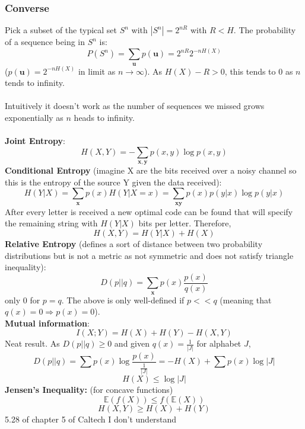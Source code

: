 \documentclass{article}
\begin{document}
\subsubsection{Converse}
Pick a subset of the typical set $S^n$ with $|S^n| = 2^{n R}$ with $R< H$. The probability of a sequence being in $S^n$ is:
$$
P(S^n) = \sum_{\bm u} p(\bm u) = 2^{n R}2^{-n H(X)}
$$
($p(\bm u) = 2^{-n H(X)}$ in limit as $n \rightarrow \infty$). As $H(X) - R  > 0$, this tends to $0$ as $n$ tends to infinity.\\\\
Intuitively it doesn't work as the number of sequences we missed grows exponentially as $n$ heads to infinity.\\\\
\textbf{Joint Entropy}:
\begin{equation}
    H(X,Y) = - \sum_{\bm x, \bm y} p(x,y) \log p(x,y)
\end{equation}
\textbf{Conditional Entropy} (imagine X are the bits received over a noisy channel so this is the entropy of the source Y given the data received):
\begin{equation}
    H(Y|X) = \sum_{\bm x} p(x)H(Y|X=x) = \sum_{\bm x \bm y} p(x)p(y|x)\log p(y|x)
\end{equation}
After every letter is received a new optimal code can be found that will specify the remaining string with $H(Y|X)$ bits per letter. Therefore,
\begin{equation}
    H(X,Y) = H(Y|X)+H(X)
\end{equation}
\textbf{Relative Entropy} (defines a sort of distance between two probability distributions but is not a metric as not symmetric and does not satisfy triangle inequality):
\begin{equation}
    D(p||q) = \sum_{\bm x} p(x) \frac{p(x)}{q(x)}
\end{equation}
only 0 for $p = q$. The above is only well-defined if $p << q$ (meaning that $q(x) =0 \Rightarrow p(x) = 0$). \\ \textbf{Mutual information}:
\begin{equation}
    I(X;Y) = H(X) + H(Y) - H(X,Y)
\end{equation}
Neat result. As $D(p||q) \geq 0$ and given $q(x) = \frac{1}{|J|}$ for alphabet $J$,
$$
D(p||q) = \sum p(x) \log \frac{p(x)}{\frac{1}{|J|}} = - H(X) + \sum p(x) \log |J|
$$
$$
H(X) \leq \log |J|
$$
\textbf{Jensen's Inequality:} (for concave functions)
\begin{equation}
    \mathbb{E}(f(X)) \leq f(\mathbb{E}(X))
\end{equation}
\begin{equation}
    H(X,Y) \geq H(X) + H(Y)
\end{equation}
5.28 of chapter 5 of Caltech I don't understand
\end{document}
